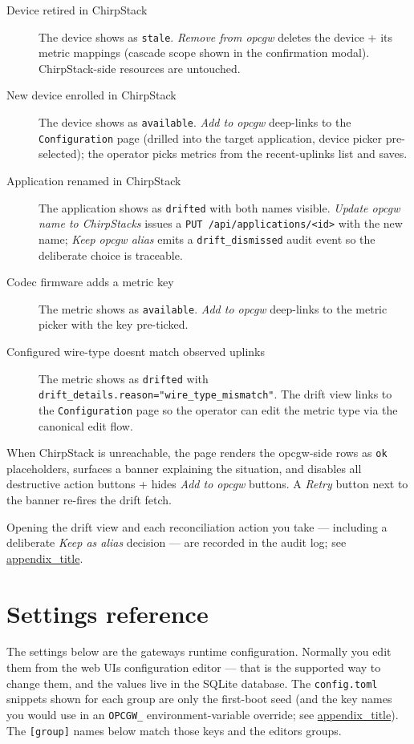 \begin{description}
\item[Device retired in ChirpStack]
The device shows as \texttt{stale}. \emph{Remove from opcgw} deletes the device + its metric mappings (cascade scope shown in the confirmation modal). ChirpStack-side resources are untouched.
\item[New device enrolled in ChirpStack]
The device shows as \texttt{available}. \emph{Add to opcgw} deep-links to the \texttt{Configuration} page (drilled into the target application, device picker pre-selected); the operator picks metrics from the recent-uplinks list and saves.
\item[Application renamed in ChirpStack]
The application shows as \texttt{drifted} with both names visible. \emph{Update opcgw name to ChirpStack\textquotesingle s} issues a \texttt{PUT\ /api/applications/\textless{}id\textgreater{}} with the new name; \emph{Keep opcgw alias} emits a \texttt{drift\_dismissed} audit event so the deliberate choice is traceable.
\item[Codec firmware adds a metric key]
The metric shows as \texttt{available}. \emph{Add to opcgw} deep-links to the metric picker with the key pre-ticked.
\item[Configured wire-type doesn\textquotesingle t match observed uplinks]
The metric shows as \texttt{drifted} with \texttt{drift\_details.reason="wire\_type\_mismatch"}. The drift view links to the \texttt{Configuration} page so the operator can edit the metric type via the canonical edit flow.
\end{description}

When ChirpStack is unreachable, the page renders the opcgw-side rows as \texttt{ok} placeholders, surfaces a banner explaining the situation, and disables all destructive action buttons + hides \emph{Add to opcgw} buttons. A \emph{Retry} button next to the banner re-fires the drift fetch.

Opening the drift view and each reconciliation action you take --- including a deliberate \emph{Keep as alias} decision --- are recorded in the audit log; see \hyperref[app-audit-events]{appendix\_title}.

\section{Settings reference}\label{sec-settings-reference}

The settings below are the gateway\textquotesingle s runtime configuration. Normally you edit them from the web UI\textquotesingle s configuration editor --- that is the supported way to change them, and the values live in the SQLite database. The \texttt{config.toml} snippets shown for each group are only the first-boot seed (and the key names you would use in an \texttt{OPCGW\_} environment-variable override; see \hyperref[app-env-reference]{appendix\_title}). The \texttt{{[}group{]}} names below match those keys and the editor\textquotesingle s groups.


